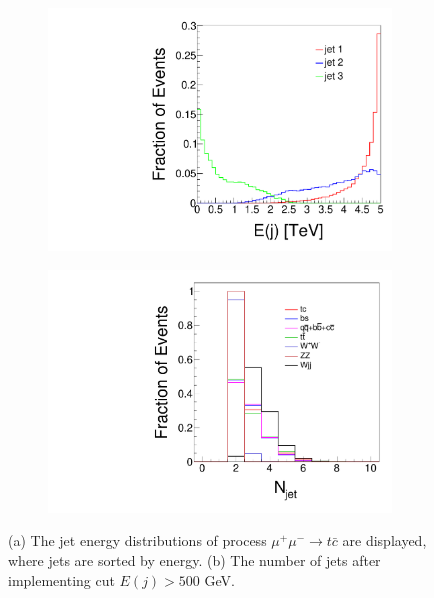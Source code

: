 \documentclass[a4paper,11pt]{article}
\begin{document}
\begin{figure}[htbp]
  \centering
  \captionsetup[sub]{font=large}
  \begin{subfigure}[t]{0.45\textwidth}
     \includegraphics[width=\linewidth]{ej_tc.pdf}
     \caption{}
     \label{subfig:ej_tc}
  \end{subfigure}
  \begin{subfigure}[t]{0.45\textwidth}
     \includegraphics[width=\linewidth]{njets.pdf}
     \caption{}
     \label{subfig:njets}
  \end{subfigure}
  \caption{(a) The jet energy distributions of process $\mu^+\mu^-\to t\bar{c}$ are displayed, where jets are sorted by energy. (b) The number of jets after implementing cut $E(j)>500$ GeV.}\label{fig:base}
\end{figure}
\end{document}

